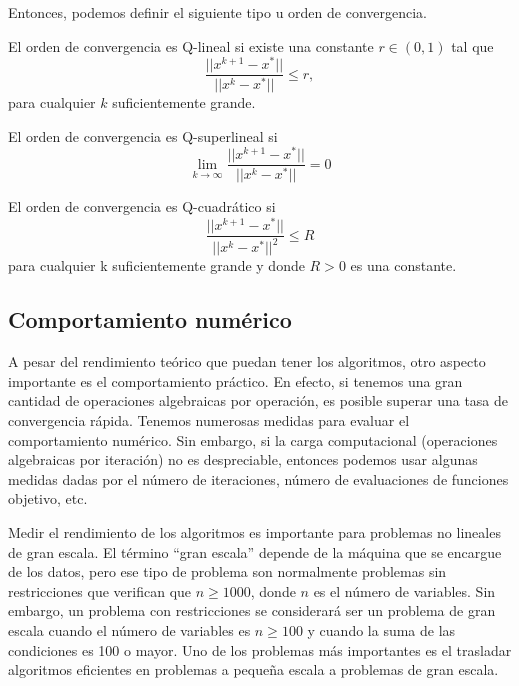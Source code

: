 Entonces, podemos definir el siguiente tipo u orden de convergencia.

\begin{definicion}
El orden de convergencia es Q-lineal si existe una constante $r\in (0,1)$ tal que
\begin{equation*}
\dfrac{||x^{k+1}-x^*||}{||x^k-x^*||} \leq r,
\end{equation*}
para cualquier $k$ suficientemente grande.
\end{definicion}

\begin{definicion}
El orden de convergencia es Q-superlineal si
\begin{equation*}
\lim_{k\xrightarrow{}{}\infty}\dfrac{||x^{k+1}-x^*||}{||x^k-x^*||} = 0
\end{equation*}
\end{definicion}

\begin{definicion}
El orden de convergencia es Q-cuadrático si
\begin{equation*}
\dfrac{||x^{k+1}-x^*||}{||x^k-x^*||^2} \leq R
\end{equation*}
para cualquier k suficientemente grande y donde $R>0$ es una constante.
\end{definicion}

\subsection{Comportamiento numérico}

A pesar del rendimiento teórico que puedan tener los algoritmos, otro aspecto importante es el comportamiento práctico. 
En efecto, si tenemos una gran cantidad de operaciones algebraicas por operación, es posible superar una tasa de convergencia rápida. 
Tenemos numerosas medidas para evaluar el comportamiento numérico. 
Sin embargo, si la carga computacional (operaciones algebraicas por iteración) no es despreciable, entonces podemos usar algunas medidas dadas por el número de iteraciones, número de evaluaciones de funciones objetivo, etc.

Medir el rendimiento de los algoritmos es importante para problemas no lineales de gran escala. 
El término ``gran escala'' depende de la máquina que se encargue de los datos, pero ese tipo de problema son normalmente problemas sin restricciones que verifican que $n\geq 1000$, donde $n$ es el número de variables. 
Sin embargo, un problema con restricciones se considerará ser un problema de gran escala cuando el número de variables es $n\geq 100$ y cuando la suma de las condiciones es 100 o mayor. 
Uno de los problemas más importantes es el trasladar algoritmos eficientes en problemas a pequeña escala a problemas de gran escala.


